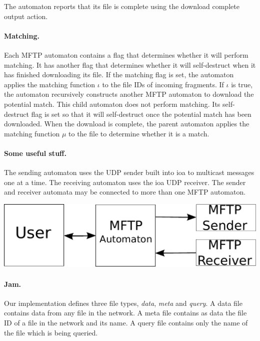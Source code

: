 \documentclass[letterpaper]{article}
\begin{document}
The automaton reports that its file is complete using the download complete output action.

\paragraph{Matching.}
Each MFTP automaton contains a flag that determines whether it will perform matching. 
It has another flag that determines whether it will self-destruct when it has finished downloading its file.
If the matching flag is set, the automaton applies the matching function $\iota$ to the file IDs of incoming fragments.
If $\iota$ is true, the automaton recursively constructs another MFTP automaton to download the potential match.
This child automaton does not perform matching.  
Its self-destruct flag is set so that it will self-destruct once the potential match has been downloaded.
When the download is complete, the parent automaton applies the matching function $\mu$ to the file to determine whether it is a match.

\paragraph{Some useful stuff.} %
The sending automaton uses the UDP sender built into ioa to multicast messages one at a time.
The receiving automaton uses the ioa UDP receiver.
The sender and receiver automata may be connected to more than one MFTP automaton.

\vspace{5mm}
\includegraphics[scale=0.65]{diagramOne}

\paragraph{Jam.} %
Our implementation defines three file types, \emph{data}, \emph{meta} and \emph{query}.  
A data file contains data from any file in the network.
A meta file contains as data the file ID of a file in the network and its name. 
A query file contains only the name of the file which is being queried.
\end{document}

